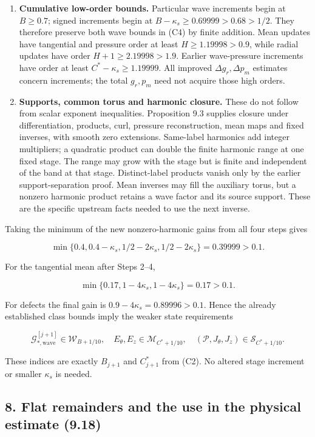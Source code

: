 \documentclass[10pt,a4paper]{article}
\begin{document}
\begin{enumerate}
\item
  \textbf{Cumulative low-order bounds.} Particular wave increments begin at \(B\ge0.7\); signed increments begin at \(B-\kappa_s\ge0.69999>0.68>1/2\). They therefore preserve both wave bounds in (C4) by finite addition. Mean updates have tangential and pressure order at least \(H\ge1.19998>0.9\), while radial updates have order \(H+1\ge2.19998>1.9\). Earlier wave-pressure increments have order at least \(C^*-\kappa_s\ge1.19999\). All improved \(\Delta g_r,\Delta p_m\) estimates concern increments; the total \(g_r,p_m\) need not acquire those high orders.
\item
  \textbf{Supports, common torus and harmonic closure.} These do not follow from scalar exponent inequalities. Proposition 9.3 supplies closure under differentiation, products, curl, pressure reconstruction, mean maps and fixed inverses, with smooth zero extensions. Same-label harmonics add integer multipliers; a quadratic product can double the finite harmonic range at one fixed stage. The range may grow with the stage but is finite and independent of the band at that stage. Distinct-label products vanish only by the earlier support-separation proof. Mean inverses may fill the auxiliary torus, but a nonzero harmonic product retains a wave factor and its source support. These are the specific upstream facts needed to use the next inverse.
\end{enumerate}

Taking the minimum of the new nonzero-harmonic gains from all four steps gives

\[
\min\{0.4,0.4-\kappa_s,1/2-2\kappa_s,1/2-2\kappa_s\}
=0.39999>0.1.
\tag{C26}
\]

For the tangential mean after Steps 2--4,

\[
\min\{0.17,1-4\kappa_s,1-4\kappa_s\}=0.17>0.1.
\tag{C27}
\]

For defects the final gain is \(0.9-4\kappa_s=0.89996>0.1\). Hence the already established class bounds imply the weaker state requirements

\[
\mathcal G_{*,\mathrm{wave}}^{[j+1]}\in\mathcal W_{B+1/10},\quad
E_\theta,E_z\in\mathcal M_{C^*+1/10},\quad
(\mathcal P,J_\theta,J_z)\in\mathcal S_{C^*+1/10}.
\tag{C28}
\]

These indices are exactly \(B_{j+1}\) and \(C^*_{j+1}\) from (C2). No altered stage increment or smaller \(\kappa_s\) is needed.

\subsection{8. Flat remainders and the use in the physical estimate (9.18)}\label{nsupstream:stage_cycle_gain_audit:flat-remainders-and-the-use-in-the-physical-estimate-9.18}
\end{document}
